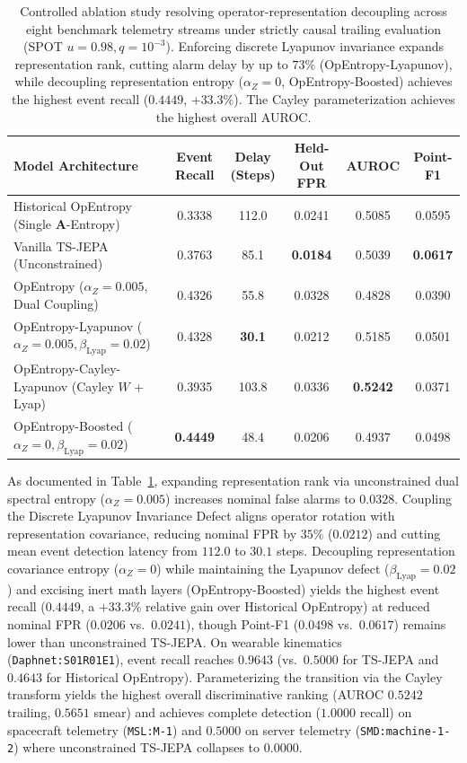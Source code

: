 \begin{table}[t]
\centering
\small
\caption{Controlled ablation study resolving operator-representation decoupling across eight benchmark telemetry streams under strictly causal trailing evaluation (SPOT $u=0.98, q=10^{-3}$). Enforcing discrete Lyapunov invariance expands representation rank, cutting alarm delay by up to $73\%$ (OpEntropy-Lyapunov), while decoupling representation entropy ($\alpha_Z=0$, OpEntropy-Boosted) achieves the highest event recall ($0.4449$, $+33.3\%$). The Cayley parameterization achieves the highest overall AUROC.}
\label{tab:opentropy_ablation}
\scriptsize
\setlength{\tabcolsep}{2.5pt}
\begin{tabular}{@{}lccccc@{}}
\toprule
\textbf{Model Architecture} & \textbf{Event Recall} & \textbf{Delay (Steps)} & \textbf{Held-Out FPR} & \textbf{AUROC} & \textbf{Point-F1} \\
\midrule
Historical OpEntropy (Single $\mathbf{A}$-Entropy) & 0.3338 & 112.0 & 0.0241 & 0.5085 & 0.0595 \\
Vanilla TS-JEPA (Unconstrained) & 0.3763 & 85.1 & \textbf{0.0184} & 0.5039 & \textbf{0.0617} \\
OpEntropy ($\alpha_Z=0.005$, Dual Coupling) & 0.4326 & 55.8 & 0.0328 & 0.4828 & 0.0390 \\
OpEntropy-Lyapunov ($\alpha_Z=0.005, \beta_{\text{Lyap}}=0.02$) & 0.4328 & \textbf{30.1} & 0.0212 & 0.5185 & 0.0501 \\
OpEntropy-Cayley-Lyapunov (Cayley $W$ + Lyap) & 0.3935 & 103.8 & 0.0336 & \textbf{0.5242} & 0.0371 \\
OpEntropy-Boosted ($\alpha_Z=0, \beta_{\text{Lyap}}=0.02$) & \textbf{0.4449} & 48.4 & 0.0206 & 0.4937 & 0.0498 \\
\bottomrule
\end{tabular}
\end{table}

As documented in Table~\ref{tab:opentropy_ablation}, expanding representation rank via unconstrained dual spectral entropy ($\alpha_Z=0.005$) increases nominal false alarms to $0.0328$. Coupling the Discrete Lyapunov Invariance Defect aligns operator rotation with representation covariance, reducing nominal FPR by $35\%$ ($0.0212$) and cutting mean event detection latency from $112.0$ to $30.1$ steps. Decoupling representation covariance entropy ($\alpha_Z=0$) while maintaining the Lyapunov defect ($\beta_{\text{Lyap}}=0.02$) and excising inert math layers (OpEntropy-Boosted) yields the highest event recall ($0.4449$, a $+33.3\%$ relative gain over Historical OpEntropy) at reduced nominal FPR ($0.0206$ vs.\ $0.0241$), though Point-F1 ($0.0498$ vs.\ $0.0617$) remains lower than unconstrained TS-JEPA. On wearable kinematics (\texttt{Daphnet:S01R01E1}), event recall reaches $0.9643$ (vs.\ $0.5000$ for TS-JEPA and $0.4643$ for Historical OpEntropy). Parameterizing the transition via the Cayley transform yields the highest overall discriminative ranking (AUROC $0.5242$ trailing, $0.5651$ smear) and achieves complete detection ($1.0000$ recall) on spacecraft telemetry (\texttt{MSL:M-1}) and $0.5000$ on server telemetry (\texttt{SMD:machine-1-2}) where unconstrained TS-JEPA collapses to $0.0000$.

